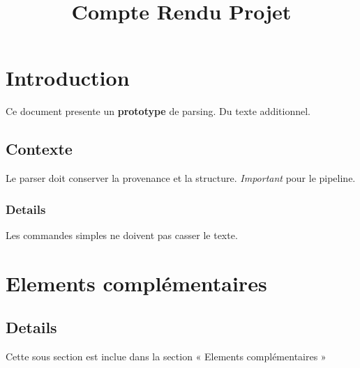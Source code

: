 \title{Compte Rendu Projet}


\maketitle

\section{Introduction}\label{sec:intro}
Ce document presente un \textbf{prototype} de parsing.
Du texte additionnel. %

\subsection{Contexte}
Le parser doit conserver la provenance et la structure.
\emph{Important} pour le pipeline.

\subsubsection{Details}
Les commandes simples ne doivent pas casser le texte.

\section{Elements complémentaires}\label{sec:compl}

\subsection{Details}
Cette sous section est inclue dans la section « Elements complémentaires »



